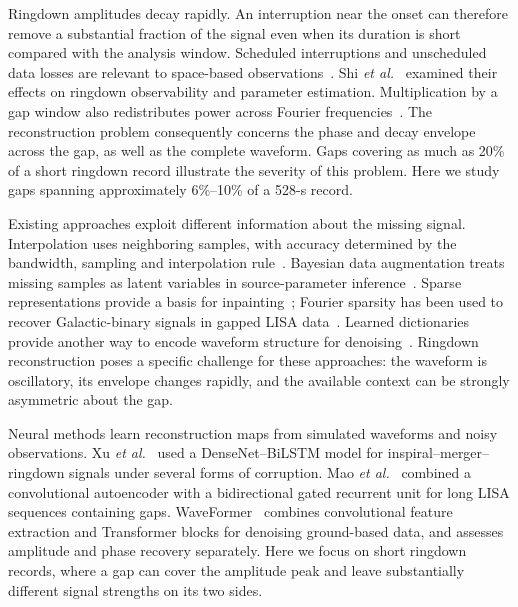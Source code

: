 \documentclass[10pt,prd,aps,a4paper,twocolumn,superscriptaddress,nofootinbib,floatfix]{revtex4-2}
\begin{document}
Ringdown amplitudes decay rapidly. An interruption near the onset can therefore remove a substantial fraction of the signal even when its duration is short compared with the analysis window. Scheduled interruptions and unscheduled data losses are relevant to space-based observations~\cite{Baghi2019,dey2021gaps}. Shi \textit{et al.}~\cite{shi2024effectsdatagapsringdown} examined their effects on ringdown observability and parameter estimation. Multiplication by a gap window also redistributes power across Fourier frequencies~\cite{Harris1978}. The reconstruction problem consequently concerns the phase and decay envelope across the gap, as well as the complete waveform. Gaps covering as much as 20\% of a short ringdown record illustrate the severity of this problem. Here we study gaps spanning approximately 6\%--10\% of a 528-s record.

Existing approaches exploit different information about the missing signal. Interpolation uses neighboring samples, with accuracy determined by the bandwidth, sampling and interpolation rule~\cite{Horowitz1974,Maeland1988,Unser1999}. Bayesian data augmentation treats missing samples as latent variables in source-parameter inference~\cite{Baghi2019}. Sparse representations provide a basis for inpainting~\cite{Starck2010}; Fourier sparsity has been used to recover Galactic-binary signals in gapped LISA data~\cite{Blelly2021}. Learned dictionaries provide another way to encode waveform structure for denoising~\cite{TorresForne2016}. Ringdown reconstruction poses a specific challenge for these approaches: the waveform is oscillatory, its envelope changes rapidly, and the available context can be strongly asymmetric about the gap.

Neural methods learn reconstruction maps from simulated waveforms and noisy observations. Xu \textit{et al.}~\cite{Xu_2024} used a DenseNet--BiLSTM model for inspiral--merger--ringdown signals under several forms of corruption. Mao \textit{et al.}~\cite{Mao:2025cae} combined a convolutional autoencoder with a bidirectional gated recurrent unit for long LISA sequences containing gaps. WaveFormer~\cite{Wang:2024waveformer} combines convolutional feature extraction and Transformer blocks for denoising ground-based data, and assesses amplitude and phase recovery separately. Here we focus on short ringdown records, where a gap can cover the amplitude peak and leave substantially different signal strengths on its two sides.
\end{document}
